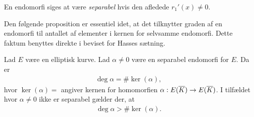 En endomorfi siges at være \textit{separabel} hvis den afledede $r_1'(x) \neq 0$.

Den følgende proposition er essentiel idet, at det tilknytter graden af en endomorfi til antallet af elementer i kernen for selvsamme endomorfi. Dette faktum benyttes direkte i beviset for Hasses sætning.

\begin{proposition}
\label{deg_to_ker}
Lad $E$ være en elliptisk kurve. Lad $\alpha \neq 0$ være en separabel 
endomorfi for $E$. Da er 
\begin{align*}
	\deg \alpha = \# \ker (\alpha),
\end{align*}
hvor $\ker (\alpha) = $ angiver kernen for homomorfien 
$\alpha : E(\overline{K}) \to E(\overline{K})$. I tilfældet hvor $\alpha \neq 0$ ikke
er separabel gælder der, at 
\begin{align*}
	\deg \alpha > \# \ker (\alpha).
\end{align*}
\end{proposition}
